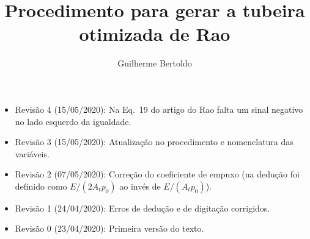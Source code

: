 \documentclass[12pt,a4paper]{article}
\author{Guilherme Bertoldo}
\title{Procedimento para gerar a tubeira otimizada de Rao}
\begin{document}
	\maketitle

\begin{itemize}
	\item Revisão 4 (15/05/2020): Na Eq.~19 do artigo do Rao falta um sinal negativo no lado esquerdo da igualdade.
	\item Revisão 3 (15/05/2020): Atualização no procedimento e nomenclatura das variáveis.
	\item Revisão 2 (07/05/2020): Correção do coeficiente de empuxo (na dedução foi definido como $E/(2A_t p_0)$ ao invés de $E/(A_t p_0)$). 
	\item Revisão 1 (24/04/2020): Erros de dedução e de digitação corrigidos.
	\item Revisão 0 (23/04/2020): Primeira versão do texto.
\end{itemize}
\end{document}
